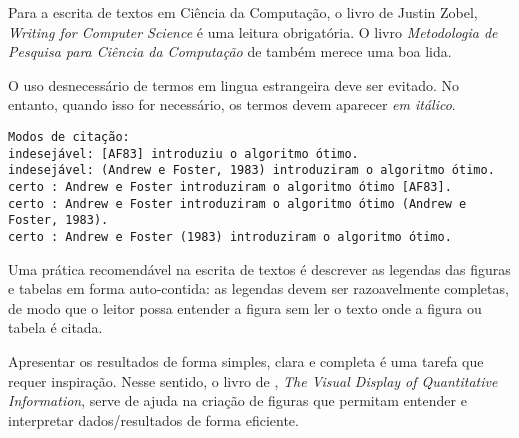 Para a escrita de textos em Ciência da Computação, o livro de Justin Zobel, 
\emph{Writing for Computer Science} \citep{zobel:04} é uma leitura obrigatória. 
O livro \emph{Metodologia de Pesquisa para Ciência da Computação} de 
\citet{waz:09} também merece uma boa lida.

O uso desnecessário de termos em lingua estrangeira deve ser evitado. No entanto,
quando isso for necessário, os termos devem aparecer \emph{em itálico}.

\begin{small}
\begin{verbatim}
Modos de citação:
indesejável: [AF83] introduziu o algoritmo ótimo.
indesejável: (Andrew e Foster, 1983) introduziram o algoritmo ótimo.
certo : Andrew e Foster introduziram o algoritmo ótimo [AF83].
certo : Andrew e Foster introduziram o algoritmo ótimo (Andrew e Foster, 1983).
certo : Andrew e Foster (1983) introduziram o algoritmo ótimo.
\end{verbatim}
\end{small}

Uma prática recomendável na escrita de textos é descrever as legendas das
figuras e tabelas em forma auto-contida: as legendas devem ser razoavelmente
completas, de modo que o leitor possa entender a figura sem ler o texto onde a
figura ou tabela é citada.  

Apresentar os resultados de forma simples, clara e completa é uma tarefa que
requer inspiração. Nesse sentido, o livro de \citet{tufte01:visualDisplay},
\emph{The Visual Display of Quantitative Information}, serve de ajuda na
criação de figuras que permitam entender e interpretar dados/resultados de forma
eficiente.
\fi

